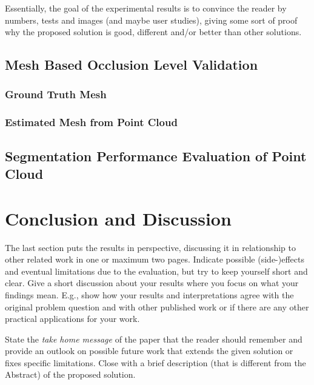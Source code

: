 \documentclass[11pt, a4paper,oneside,chapterprefix=false]{scrbook}
\begin{document}
Essentially, the goal of the experimental results is to convince the reader by numbers, tests and images (and maybe user studies), giving some sort of proof why the proposed solution is good, different and/or better than other solutions.

\section{Mesh Based Occlusion Level Validation}

\subsection{Ground Truth Mesh}


\subsection{Estimated Mesh from Point Cloud}

\section{Segmentation Performance Evaluation of Point Cloud}

\chapter{Conclusion and Discussion} \label{chp:conclusion}

The last section puts the results in perspective, discussing it in relationship to other related work in one or maximum two pages. Indicate possible (side-)effects and eventual limitations due to the evaluation, but try to keep yourself short and clear. Give a short discussion about your results where you focus on what your findings mean. E.g., show how your results and interpretations agree with the original problem question and with other published work or if there are any other practical applications for your work.

State the \emph{take home message} of the paper that the reader should remember and provide an outlook on possible future work that extends the given solution or fixes specific limitations. Close with a brief description (that is different from the Abstract) of the proposed solution.

\end{document}
